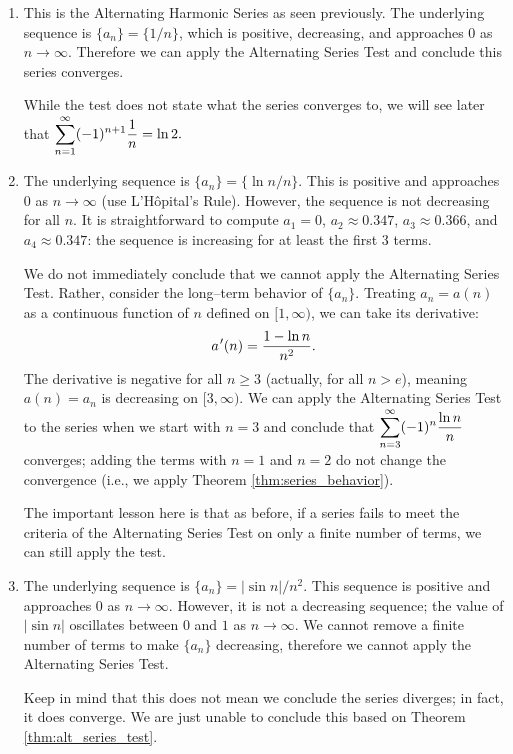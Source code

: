 {\begin{enumerate}
	\item This is the Alternating Harmonic Series as seen previously. The underlying sequence is $\{a_n\} = \{1/n\}$, which is positive, decreasing, and approaches 0 as $n\to\infty$. Therefore we can apply the Alternating Series Test and conclude this series converges. 
	
	While the test does not state what the series converges to, we will see later that $\displaystyle \sum_{n=1}^\infty (-1)^{n+1}\frac1n=\ln2.$
	
	\item		The underlying sequence is $\{a_n\} = \{\ln n/n\}$. This is positive and approaches 0 as $n\to\infty$ (use L'H\^opital's Rule). However, the sequence is not decreasing for all $n$. It is straightforward to compute $a_1=0$, $a_2\approx0.347$, $a_3\approx 0.366$, and $a_4\approx 0.347$: the sequence is increasing for at least the first 3 terms. 
	
	We do not immediately conclude that we cannot apply the Alternating Series Test. Rather, consider the long--term behavior of $\{a_n\}$. Treating $a_n=a(n)$ as a continuous function of $n$ defined on $[1,\infty)$, we can take its derivative:
	$$a\hskip.75pt'(n) = \frac{1-\ln n}{n^2}.$$
	The derivative is negative for all $n\geq 3$ (actually, for all $n>e$), meaning $a(n)=a_n$ is decreasing on $[3,\infty)$. We can apply the Alternating Series Test to the series when we start with $n=3$ and conclude that $\displaystyle \sum_{n=3}^\infty(-1)^n\frac{\ln n}{n}$ converges; adding the terms with $n=1$ and $n=2$ do not change the convergence (i.e., we apply Theorem \ref{thm:series_behavior}).
	
	The important lesson here is that as before, if a series fails to meet the criteria of the Alternating Series Test on only a finite number of terms, we can still apply the test.
	
	\item  The underlying sequence is $\{a_n\} = |\sin n|/n^2$. This sequence is positive and approaches $0$ as $n\to\infty$. However, it is not a decreasing sequence; the value of $|\sin n|$ oscillates between $0$ and $1$ as $n\to\infty$. We cannot remove a finite number of terms to make $\{a_n\}$ decreasing, therefore we cannot apply the Alternating Series Test.
	
	Keep in mind that this does not mean we conclude the series diverges; in fact, it does converge. We are just unable to conclude this based on Theorem \ref{thm:alt_series_test}.
\end{enumerate}
\baselineskip
}\\

